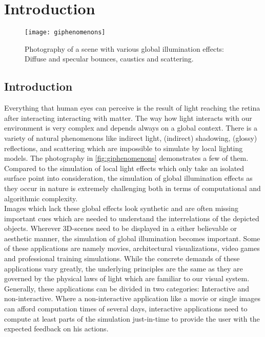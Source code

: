 \documentclass[thesis.tex]{subfiles}
\begin{document}
\chapter{Introduction}
\label{chap:introduction}

\begin{figure}[h]
\centering
\texttt{[image: giphenomenons]}
\caption{\cite{bib:RealtimeGIOverview} Photography of a scene with various global illumination effects: Diffuse and specular bounces, caustics and scattering.}
\label{fig:giphenomenons}
\end{figure}

\section{Introduction}
Everything that human eyes can perceive is the result of light reaching the retina after interacting interacting with matter.
The way how light interacts with our environment is very complex and depends always on a global context.
There is a variety of natural phenomenons like indirect light, (indirect) shadowing, (glossy) reflections, and scattering which are impossible to simulate by local lighting models.
The photography in \autoref{fig:giphenomenons} demonstrates a few of them.
Compared to the simulation of local light effects which only take an isolated surface point into consideration, the simulation of global illumination effects as they occur in nature is extremely challenging both in terms of computational and algorithmic complexity.
\\
Images which lack these global effects look synthetic and are often missing important cues which are needed to understand the interrelations of the depicted objects.
Wherever 3D-scenes need to be displayed in a either believable or aesthetic manner, the simulation of global illumination becomes important.
Some of these applications are namely movies, architectural visualizations, video games and professional training simulations.
While the concrete demands of these applications vary greatly, the underlying principles are the same as they are governed by the physical laws of light which are familiar to our visual system.
\\
Generally, these applications can be divided in two categories: Interactive and non-interactive.
Where a non-interactive application like a movie or single images can afford computation times of several days, interactive applications need to compute at least parts of the simulation just-in-time to provide the user with the expected feedback on his actions.
\end{document}
